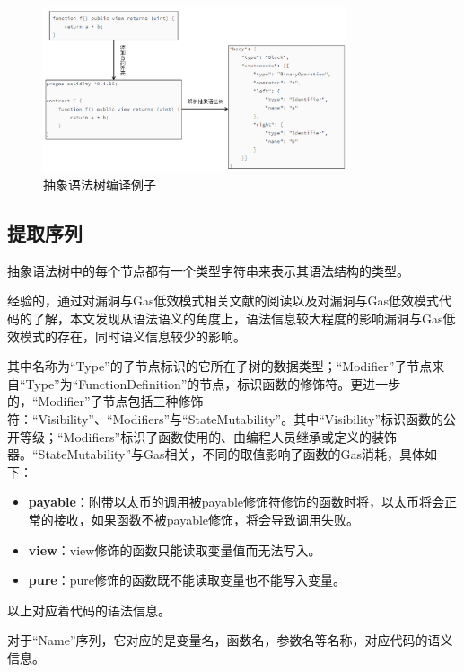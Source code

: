 \begin{figure}[htbp]
\centering
\includegraphics[width=0.8\textwidth]{figures/repair.png}
\caption{抽象语法树编译例子}
\label{ast-exa}
\end{figure}

\subsection{提取序列}

抽象语法树中的每个节点都有一个类型字符串来表示其语法结构的类型。

经验的，通过对漏洞与Gas低效模式相关文献的阅读以及对漏洞与Gas低效模式代码的了解，本文发现从语法语义的角度上，语法信息较大程度的影响漏洞与Gas低效模式的存在，同时语义信息较少的影响。

其中名称为“Type”的子节点标识的它所在子树的数据类型；“Modifier”子节点来自“Type”为“FunctionDefinition”的节点，标识函数的修饰符。更进一步的，“Modifier”子节点包括三种修饰符：“Visibility”、“Modifiers”与“StateMutability”。其中“Visibility”标识函数的公开等级；“Modifiers”标识了函数使用的、由编程人员继承或定义的装饰器。“StateMutability”与Gas相关，不同的取值影响了函数的Gas消耗，具体如下：
\begin{itemize}

    \item \textbf{payable}：附带以太币的调用被payable修饰符修饰的函数时将，以太币将会正常的接收，如果函数不被payable修饰，将会导致调用失败。
    \item \textbf{view}：view修饰的函数只能读取变量值而无法写入。
    \item \textbf{pure}：pure修饰的函数既不能读取变量也不能写入变量。

\end{itemize}

以上对应着代码的语法信息。

对于“Name”序列，它对应的是变量名，函数名，参数名等名称，对应代码的语义信息。

